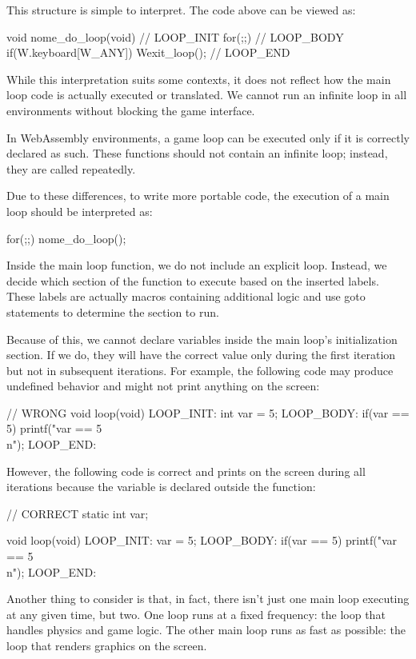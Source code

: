 This structure is simple to interpret. The code above can be viewed
as:

\alinhaverbatim
void nome\_do\_loop(void){
  // LOOP\_INIT
  for(;;){
    // LOOP\_BODY
    if(W.keyboard[W\_ANY])
        Wexit\_loop();
  }
  // LOOP\_END
}
\alinhanormal

While this interpretation suits some contexts, it does not reflect how
the main loop code is actually executed or translated. We cannot run
an infinite loop in all environments without blocking the game
interface.

In WebAssembly environments, a game loop can be executed only if it is
correctly declared as such. These functions should not contain an
infinite loop; instead, they are called repeatedly.

Due to these differences, to write more portable code, the execution
of a main loop should be interpreted as:

\alinhaverbatim
for(;;)
  nome\_do\_loop();
\alinhanormal

Inside the main loop function, we do not include an explicit
loop. Instead, we decide which section of the function to execute
based on the inserted labels. These labels are actually macros
containing additional logic and use goto statements to determine the
section to run.

Because of this, we cannot declare variables inside the main loop's
initialization section. If we do, they will have the correct value
only during the first iteration but not in subsequent iterations. For
example, the following code may produce undefined behavior and might
not print anything on the screen:

\alinhaverbatim
// WRONG
void loop(void){
LOOP\_INIT:
  int var = 5;
LOOP\_BODY:
  if(var == 5)
    printf("var == 5\\n");
LOOP\_END:
}
\alinhanormal

However, the following code is correct and prints on the screen during
all iterations because the variable is declared outside the function:

\alinhaverbatim
// CORRECT
static int var;

void loop(void){
LOOP\_INIT:
  var = 5;
LOOP\_BODY:
  if(var == 5)
    printf("var == 5\\n");
LOOP\_END:
}
\alinhanormal

Another thing to consider is that, in fact, there isn't just one main
loop executing at any given time, but two. One loop runs at a fixed
frequency: the loop that handles physics and game logic. The other
main loop runs as fast as possible: the loop that renders graphics on
the screen.

